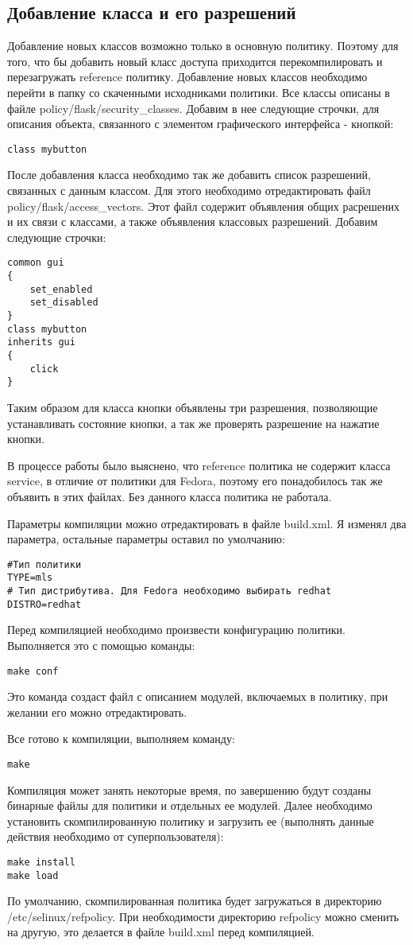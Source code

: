 \documentclass{./../class/UIR}
\begin{document}
	\subsection{Добавление класса и его разрешений}
	Добавление новых классов возможно только в основную политику. Поэтому для того,
	что бы добавить новый класс доступа приходится перекомпилировать и
	перезагружать reference политику.
	Добавление новых классов необходимо перейти в папку со скаченными исходниками
	политики. Все классы описаны в файле policy/flask/security\_classes. Добавим в
	нее следующие строчки, для описания объекта, связанного с элементом графического
	интерфейса - кнопкой:
\begin{verbatim}
class mybutton
\end{verbatim}
	После добавления класса необходимо так же добавить список разрешений, связанных
	с данным классом. Для этого необходимо отредактировать файл
	policy/flask/access\_vectors. Этот файл содержит объявления общих расрешених и
	их связи с классами, а также объявления классовых разрешений. Добавим следующие
	строчки:
\begin{verbatim}
common gui
{
    set_enabled
    set_disabled
}
class mybutton
inherits gui
{
    click
}
\end{verbatim}	
	Таким образом для класса кнопки объявлены три разрешения, позволяющие
	устанавливать состояние кнопки, а так же проверять разрешение на нажатие
	кнопки.
	
	В процессе работы было выяснено, что reference политика не содержит класса
	service, в отличие от политики для Fedora, поэтому его понадобилось так же
	объявить в этих файлах. Без данного класса политика не работала.
	
	Параметры компиляции можно отредактировать в файле build.xml.
	Я изменял два параметра, остальные параметры оставил по умолчанию:
\begin{verbatim}
#Тип политики
TYPE=mls
# Тип дистрибутива. Для Fedora необходимо выбирать redhat
DISTRO=redhat
\end{verbatim}
    Перед компиляцией необходимо произвести конфигурацию политики. Выполняется
    это с помощью команды:
\begin{verbatim}
make conf
\end{verbatim}
	Это команда создаст файл с описанием модулей, включаемых в политику, при
	желании его можно отредактировать.
	
	Все готово к компиляции, выполняем команду:
\begin{verbatim}
make
\end{verbatim}
	Компиляция может занять некоторые время, по завершению будут созданы бинарные
	файлы для политики и отдельных ее модулей. Далее необходимо установить
	скомпилированную политику и загрузить ее (выполнять данные действия необходимо
	от суперпользователя):
\begin{verbatim}
make install
make load
\end{verbatim}
	По умолчанию, скомпилированная политика будет загружаться в директорию
	/etc/selinux/refpolicy. При необходимости директорию refpolicy можно сменить на
	другую, это делается в файле build.xml перед компиляцией.
	
\end{document}
